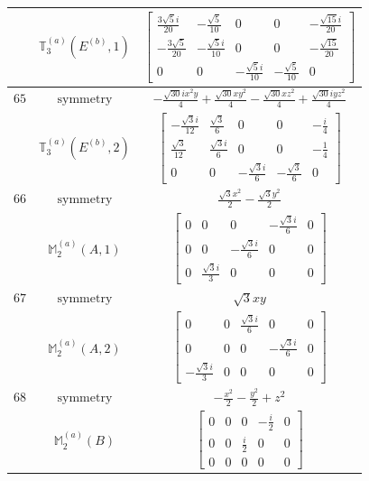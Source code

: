 \documentclass[fleqn,8pt,landscape]{jsarticle}
\begin{document}
\begin{longtable}{ccc}
$  $ & $ \mathbb{T}_{3}^{(a)}(E^{(b)},1) $ & $ \begin{bmatrix} \frac{3 \sqrt{5} i}{20} & - \frac{\sqrt{5}}{10} & 0 & 0 & - \frac{\sqrt{15} i}{20} \\ - \frac{3 \sqrt{5}}{20} & - \frac{\sqrt{5} i}{10} & 0 & 0 & - \frac{\sqrt{15}}{20} \\ 0 & 0 & - \frac{\sqrt{5} i}{10} & - \frac{\sqrt{5}}{10} & 0 \end{bmatrix} $ \\ \hline
$ 65 $ & $ \text{symmetry} $ & $ - \frac{\sqrt{30} i x^{2} y}{4} + \frac{\sqrt{30} x y^{2}}{4} - \frac{\sqrt{30} x z^{2}}{4} + \frac{\sqrt{30} i y z^{2}}{4} $ \\
$  $ & $ \mathbb{T}_{3}^{(a)}(E^{(b)},2) $ & $ \begin{bmatrix} - \frac{\sqrt{3} i}{12} & \frac{\sqrt{3}}{6} & 0 & 0 & - \frac{i}{4} \\ \frac{\sqrt{3}}{12} & \frac{\sqrt{3} i}{6} & 0 & 0 & - \frac{1}{4} \\ 0 & 0 & - \frac{\sqrt{3} i}{6} & - \frac{\sqrt{3}}{6} & 0 \end{bmatrix} $ \\ \hline
$ 66 $ & $ \text{symmetry} $ & $ \frac{\sqrt{3} x^{2}}{2} - \frac{\sqrt{3} y^{2}}{2} $ \\
$  $ & $ \mathbb{M}_{2}^{(a)}(A,1) $ & $ \begin{bmatrix} 0 & 0 & 0 & - \frac{\sqrt{3} i}{6} & 0 \\ 0 & 0 & - \frac{\sqrt{3} i}{6} & 0 & 0 \\ 0 & \frac{\sqrt{3} i}{3} & 0 & 0 & 0 \end{bmatrix} $ \\ \hline
$ 67 $ & $ \text{symmetry} $ & $ \sqrt{3} x y $ \\
$  $ & $ \mathbb{M}_{2}^{(a)}(A,2) $ & $ \begin{bmatrix} 0 & 0 & \frac{\sqrt{3} i}{6} & 0 & 0 \\ 0 & 0 & 0 & - \frac{\sqrt{3} i}{6} & 0 \\ - \frac{\sqrt{3} i}{3} & 0 & 0 & 0 & 0 \end{bmatrix} $ \\ \hline
$ 68 $ & $ \text{symmetry} $ & $ - \frac{x^{2}}{2} - \frac{y^{2}}{2} + z^{2} $ \\
$  $ & $ \mathbb{M}_{2}^{(a)}(B) $ & $ \begin{bmatrix} 0 & 0 & 0 & - \frac{i}{2} & 0 \\ 0 & 0 & \frac{i}{2} & 0 & 0 \\ 0 & 0 & 0 & 0 & 0 \end{bmatrix} $ \\ \hline

\end{longtable}
\end{document}
